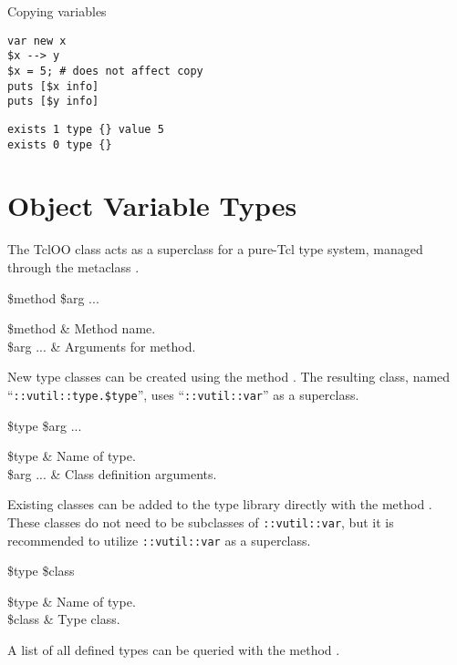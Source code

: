 \documentclass{article}
\begin{document}
\begin{example}{Copying variables}
\begin{lstlisting}
var new x
$x --> y
$x = 5; # does not affect copy
puts [$x info]
puts [$y info]
\end{lstlisting}
\tcblower
\begin{lstlisting}
exists 1 type {} value 5
exists 0 type {}
\end{lstlisting}
\end{example}

\clearpage
\section{Object Variable Types}
The  TclOO class acts as a superclass for a pure-Tcl type system, managed through the metaclass .
\begin{syntax}
 \$method \$arg ...
\end{syntax}
\begin{args}
\$method & Method name. \\
\$arg ... & Arguments for method.
\end{args}

New type classes can be created using the method .
The resulting class, named ``\texttt{::vutil::type.\$type}'', uses ``\texttt{::vutil::var}'' as a superclass. 
\begin{syntax}
 \$type \$arg ...
\end{syntax}
\begin{args}
\$type & Name of type. \\
\$arg ... & Class definition arguments. 
\end{args}

Existing classes can be added to the type library directly with the method . 
These classes do not need to be subclasses of \texttt{::vutil::var}, but it is recommended to utilize \texttt{::vutil::var} as a superclass.

\begin{syntax}
 \$type \$class
\end{syntax}
\begin{args}
\$type & Name of type. \\
\$class & Type class.
\end{args}

A list of all defined types can be queried with the method . 
\begin{syntax}
\end{syntax}
\end{document}
